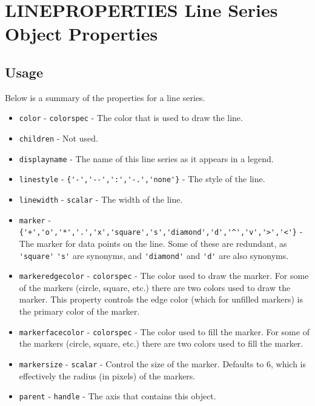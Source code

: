 \section{LINEPROPERTIES Line Series Object Properties}

\subsection{Usage}

Below is a summary of the properties for a line series.
\begin{itemize}
\item  \verb|color| - \verb|colorspec| - The color that is used to 
 draw the line.

\item  \verb|children| - Not used.

\item  \verb|displayname| - The name of this line series as it
 appears in a legend.

\item  \verb|linestyle| - \verb|{'-','--',':','-.','none'}| - The style of the line.

\item  \verb|linewidth| - \verb|scalar| - The width of the line.

\item  \verb|marker| - \verb|{'+','o','*','.','x','square','s','diamond','d','^','v','>','<'}| - 
 The marker for data points on the line.  Some of these are redundant, as \verb|'square'| 
 \verb|'s'| are synonyms, and \verb|'diamond'| and \verb|'d'| are also synonyms.

\item  \verb|markeredgecolor| - \verb|colorspec| - The color used to draw the marker.  For some
 of the markers (circle, square, etc.) there are two colors used to draw the marker.
 This property controls the edge color (which for unfilled markers) is the primary
 color of the marker.

\item  \verb|markerfacecolor| - \verb|colorspec| - The color used to fill the marker.  For some
 of the markers (circle, square, etc.) there are two colors used to fill the marker.

\item  \verb|markersize| - \verb|scalar| - Control the size of the marker.  Defaults to 6, which
 is effectively the radius (in pixels) of the markers.

\item  \verb|parent| - \verb|handle| - The axis that contains this object.


\end{itemize}
